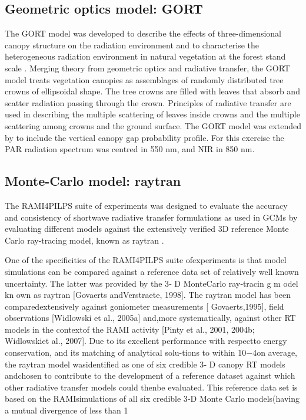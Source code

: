 \subsection{Geometric optics model: GORT}\label{section:gort}
The GORT model was developed to describe the effects of three-dimensional canopy structure on the radiation environment and to characterise the heterogeneous radiation environment in natural vegetation at the forest stand scale \citep{Li1995}. Merging theory from geometric optics and radiative transfer, the GORT model treats vegetation canopies as assemblages of randomly distributed tree crowns of ellipsoidal shape. The tree crowns are filled with leaves that absorb and scatter radiation passing through the crown. Principles of radiative transfer are used in describing the multiple scattering of leaves inside crowns and the multiple scattering among crowns and the ground surface. The GORT model was extended by \citet{Ni1997} to include the vertical canopy gap probability profile. For this exercise the PAR radiation spectrum was centred in 550 nm, and NIR in 850 nm.

\subsection{Monte-Carlo model: raytran}\label{section:raytran}

The RAMI4PILPS \citep{Widlowski2011} suite of experiments was designed to evaluate the accuracy and consistency of shortwave radiative transfer formulations as used in GCMs by evaluating different models against the extensively verified 3D reference Monte Carlo ray-tracing model, known as raytran \citep{Govaerts1995}.

One of the specificities of the RAMI4PILPS suite ofexperiments is that model simulations can be compared against a reference data set of relatively well known uncertainty. The latter was provided by the 3‐ D MonteCarlo ray‐tracin g m odel kn own as raytran [Govaerts andVerstraete, 1998]. The raytran model has been comparedextensively against goniometer measurements [ Govaerts,1995], field observations [Widlowski et al., 2005a] and,more systematically, against other RT models in the contextof the RAMI activity [Pinty et al., 2001, 2004b; Widlowskiet al., 2007]. Due to its excellent performance with respectto energy conservation, and its matching of analytical solu-tions to within 10−4on average, the raytran model wasidentified as one of six credible 3‐ D canopy RT models andchosen to contribute to the development of a reference dataset against which other radiative transfer models could thenbe evaluated. This reference data set is based on the RAMIsimulations of all six credible 3‐D Monte Carlo models(having a mutual divergence of less than 1%

